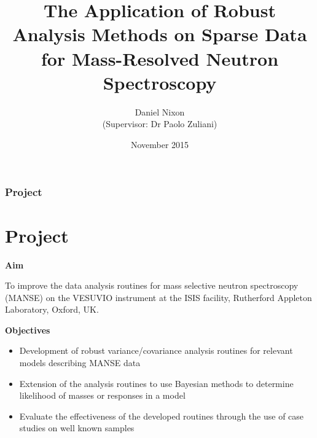 \documentclass[10pt,serif,t]{beamer}
\title{The Application of Robust Analysis Methods on Sparse Data for
       Mass-Resolved Neutron Spectroscopy}
\author{Daniel Nixon \\
        (Supervisor: Dr Paolo Zuliani)}
\date{November 2015}
\newcommand\Heading[1]{%
  {\bfseries#1}\par\smallskip}
\newenvironment{Slide}[1]
{
\begin{frame}[fragile,environment=Slide]
  \frametitle{#1}
  \section{#1}
}
{
\end{frame}
}
\begin{document}
\frame{\titlepage}

\begin{Slide}{Project}
  \Heading{Aim}
  To improve the data analysis routines for mass selective neutron spectroscopy
  (MANSE) on the VESUVIO instrument at the ISIS facility, Rutherford Appleton
  Laboratory, Oxford, UK.

  \par\bigskip
  \Heading{Objectives}
  \begin{itemize}
    \item Development of robust variance/covariance analysis routines for
          relevant models describing MANSE data
    \item Extension of the analysis routines to use Bayesian methods to
          determine likelihood of masses or responses in a model
    \item Evaluate the effectiveness of the developed routines through the use
          of case studies on well known samples
  \end{itemize}
\end{Slide}
\end{document}
